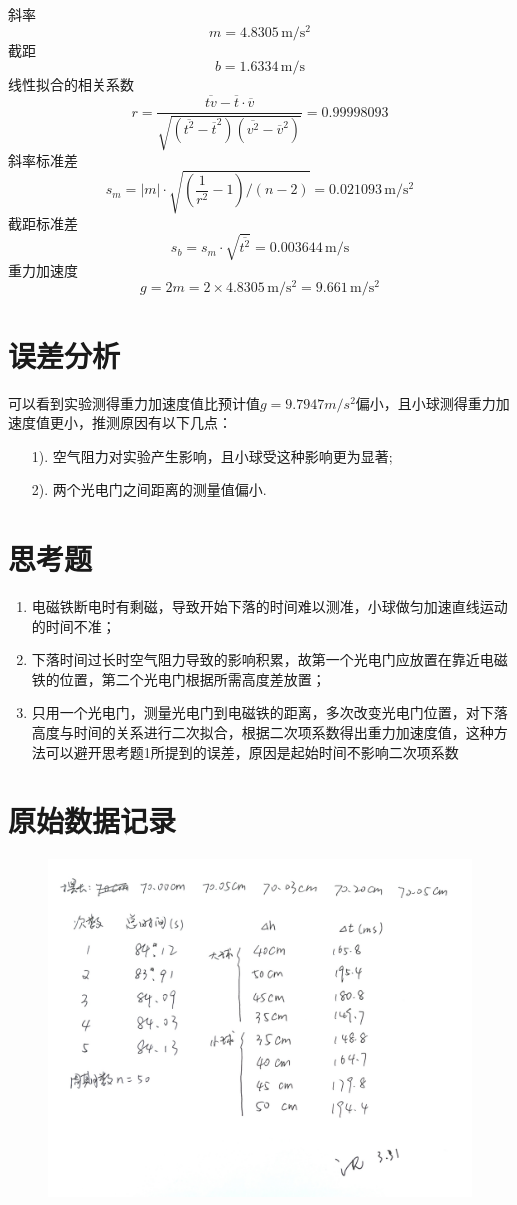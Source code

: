 \documentclass[UTF8]{ctexart}
\begin{document}
\begin{enumerate}
    \noindent 斜率
    $$
    m=4.8305\,\mathrm{m/s^2}
    $$
    截距
    $$
    b=1.6334\,\mathrm{m/s}
    $$
    线性拟合的相关系数
    $$
    r=\frac{\overline{tv}-\overline{t}\cdot\overline{v}}{\sqrt{\left(\overline{t^2}-\overline{t}^2\right)\left(\overline{v^2}-\overline{v}^2\right)}}=0.99998093
    $$
    斜率标准差
    $$
    s_m=\lvert m\rvert\cdot\sqrt{\left(\frac{1}{r^2}-1\right)/(n-2)}=0.021093\,\mathrm{m/s^2}
    $$
    截距标准差
    $$
    s_b=s_m\cdot\sqrt{\overline{t^2}}=0.003644\,\mathrm{m/s}
    $$
    重力加速度
    $$
    g=2 m=2\times 4.8305\,\mathrm{m/s^2}=9.661\,\mathrm{m/s^2}
    $$
\end{enumerate}
\section{误差分析}
可以看到实验测得重力加速度值比预计值$g=9.7947m/s^2$偏小，且小球测得重力加速度值更小，推测原因有以下几点：
\begin{enumerate}
    \item [1).] 空气阻力对实验产生影响，且小球受这种影响更为显著;
    \item [2).] 两个光电门之间距离的测量值偏小.
\end{enumerate}
\section{思考题}
\begin{enumerate}
    \item 电磁铁断电时有剩磁，导致开始下落的时间难以测准，小球做匀加速直线运动的时间不准；
    \item 下落时间过长时空气阻力导致的影响积累，故第一个光电门应放置在靠近电磁铁的位置，第二个光电门根据所需高度差放置；
    \item 只用一个光电门，测量光电门到电磁铁的距离，多次改变光电门位置，对下落高度与时间的关系进行二次拟合，根据二次项系数得出重力加速度值，这种方法可以避开思考题1所提到的误差，原因是起始时间不影响二次项系数
\end{enumerate}
\section{原始数据记录}
\begin{figure}[h]
    \centering
    \includegraphics[scale=0.55]{data.png}
\end{figure}


\end{document}
